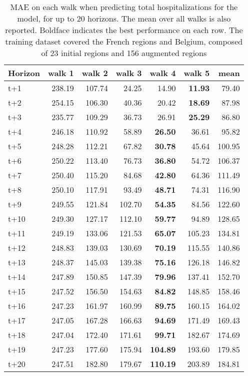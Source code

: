 \begin{table}[H]
\centering
\caption{MAE on each walk when predicting total hospitalizations for the model, for up to 20 horizons. The mean over all walks is also reported. Boldface indicates the best performance on each row. The training dataset covered the French regions and Belgium, composed of 23 initial regions and 156 augmented regions }
\label{tab:MAE_walk_encoder_decoder}
\begin{tabular}{lrrrrrr}
\toprule
Horizon &  walk 1 &  walk 2 &  walk 3 &  walk 4 &  walk 5 &   mean \\
\midrule
t+1  & 238.19  & 107.74  & 24.25  & 14.90  & \textbf{11.93}  & 79.40  \\
t+2  & 254.15  & 106.30  & 40.36  & 20.42  & \textbf{18.69}  & 87.98  \\
t+3  & 235.77  & 109.29  & 36.73  & 26.91  & \textbf{25.29}  & 86.80  \\
t+4  & 246.18  & 110.92  & 58.89  & \textbf{26.50}  & 36.61  & 95.82  \\
t+5  & 248.28  & 112.21  & 67.82  & \textbf{30.78}  & 45.64  & 100.95  \\
t+6  & 250.22  & 113.40  & 76.73  & \textbf{36.80}  & 54.72  & 106.37  \\
t+7  & 250.40  & 115.20  & 84.68  & \textbf{42.80}  & 64.36  & 111.49  \\
t+8  & 250.10  & 117.91  & 93.49  & \textbf{48.71}  & 74.31  & 116.90  \\
t+9  & 249.55  & 121.84  & 102.70  & \textbf{54.35}  & 84.56  & 122.60  \\
t+10  & 249.30  & 127.17  & 112.10  & \textbf{59.77}  & 94.89  & 128.65  \\
t+11  & 249.19  & 133.06  & 121.53  & \textbf{65.07}  & 105.23  & 134.81  \\
t+12  & 248.83  & 139.03  & 130.69  & \textbf{70.19}  & 115.55  & 140.86  \\
t+13  & 248.37  & 145.03  & 139.38  & \textbf{75.16}  & 126.18  & 146.82  \\
t+14  & 247.89  & 150.85  & 147.39  & \textbf{79.96}  & 137.41  & 152.70  \\
t+15  & 247.52  & 156.50  & 154.63  & \textbf{84.82}  & 148.85  & 158.46  \\
t+16  & 247.23  & 161.97  & 160.99  & \textbf{89.75}  & 160.15  & 164.02  \\
t+17  & 247.05  & 167.28  & 166.63  & \textbf{94.69}  & 171.49  & 169.43  \\
t+18  & 247.04  & 172.40  & 171.61  & \textbf{99.71}  & 182.67  & 174.69  \\
t+19  & 247.23  & 177.60  & 175.94  & \textbf{104.89}  & 193.60  & 179.85  \\
t+20  & 247.51  & 182.80  & 179.67  & \textbf{110.19}  & 203.89  & 184.81  \\

\bottomrule
\end{tabular}
\end{table}

